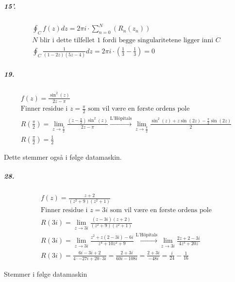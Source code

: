 \documentclass[11pt, A4paper,norsk]{article}
\begin{document}
			\subparagraph{15'.}
				\begin{gather*}
\oint_C f(z) dz = 2 \pi i \cdot \sum_{n = 0}^{N}(R_n( z_n )) \\
\text{$N$ blir i dette tilfellet $1$ fordi begge singularitetene ligger inni $C$} \\
\oint_C \frac{1}{(1 - 2z)(5z - 4)} dz = 2 \pi i \cdot \left( \frac{1}{3} - \frac{1}{3} \right) = 0
				\end{gather*}









			\subparagraph{19.}
				\begin{gather*}
f(z) = \frac{\sin^2(z)}{2z - \pi} \\
\text{Finner residue i $z = \frac{\pi}{2}$ som vil være en første ordens pole} \\
R\left( \frac{\pi}{2} \right) = \lim_{z \rightarrow \frac{\pi}{2}} \frac{\left( z - \frac{\pi}{2} \right) \sin^2(z)}{2z - \pi} \xrightarrow{\text{L'Hôpitals}} \lim_{z \rightarrow \frac{\pi}{2}} \frac{\sin^2(z) + z\sin(2z) - \frac{\pi}{2} \sin(2z)}{2} \\
R\left( \frac{\pi}{2} \right) = \frac{1}{2}
				\end{gather*}
				\begin{flushleft}
Dette stemmer også i følge datamaskin.
				\end{flushleft}









			\subparagraph{28.}
				\begin{gather*}
f(z) = \frac{z + 2}{(z^2 + 9)(z^2 + 1)} \\
\text{Finner residue i $z = 3i$ som vil være en første ordens pole} \\
R( 3i ) = \lim_{z \rightarrow 3i} \frac{( z - 3i ) ( z + 2 )}{( z^2 + 9 )( z^2 + 1 )} \\
R( 3i ) = \lim_{z \rightarrow 3i} \frac{z^2 + z(2 - 3i) - 6i}{z^4 + 10z^2 + 9} \xrightarrow{\text{L'Hôpitals}} \lim_{z \rightarrow 3i} \frac{2z + 2 - 3i}{4z^3 + 20z} \\
R( 3i ) = \frac{6i - 3i + 2}{4 \cdot - 27i + 20 \cdot 3i} = \frac{2 + 3i}{60i - 108i} = \frac{2 + 3i}{- 48i} = \frac{i}{24} - \frac{1}{16}
				\end{gather*}
				\begin{flushleft}
Stemmer i følge datamaskin
				\end{flushleft}
\end{document}
